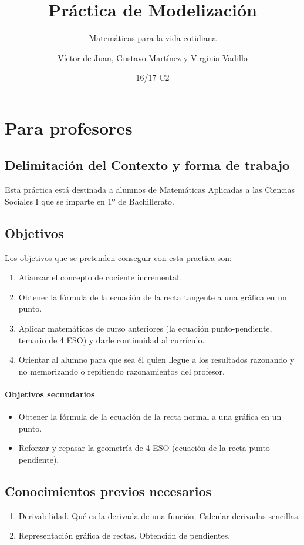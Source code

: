 \documentclass[palatino,nobuilddate,nochap]{apuntesURJC}
\title{Práctica de Modelización}
\subtitle{Matemáticas para la vida cotidiana}
\author{Víctor de Juan, Gustavo Martínez y Virginia Vadillo}
\date{16/17 C2}
\begin{document}
\maketitle


\section{Para profesores}

\subsection{Delimitación del Contexto y forma de trabajo}
Esta práctica está destinada a alumnos de Matemáticas Aplicadas a las Ciencias Sociales I que se imparte en 1º de Bachillerato.

\subsection{Objetivos}

Los objetivos que se pretenden conseguir con esta practica son:
\begin{enumerate}
	\item Afianzar el concepto de cociente incremental.
	\item Obtener la fórmula de la ecuación de la recta tangente a una gráfica en un punto.
	\item Aplicar matemáticas de curso anteriores (la ecuación punto-pendiente, temario de 4 ESO) y darle continuidad al currículo.
	\item Orientar al alumno para que sea él quien llegue a los resultados razonando y no memorizando o repitiendo razonamientos del profesor.
\end{enumerate}

\paragraph{Objetivos secundarios}
\begin{itemize}
	\item Obtener la fórmula de la ecuación de la recta normal a una gráfica en un punto.
	\item Reforzar y repasar la geometría de 4 ESO (ecuación de la recta punto-pendiente).
\end{itemize}


\subsection{Conocimientos previos necesarios}
\begin{enumerate}
	\item Derivabilidad. Qué es la derivada de una función. Calcular derivadas sencillas.
	\item Representación gráfica de rectas. Obtención de pendientes.
\end{enumerate}
\end{document}

